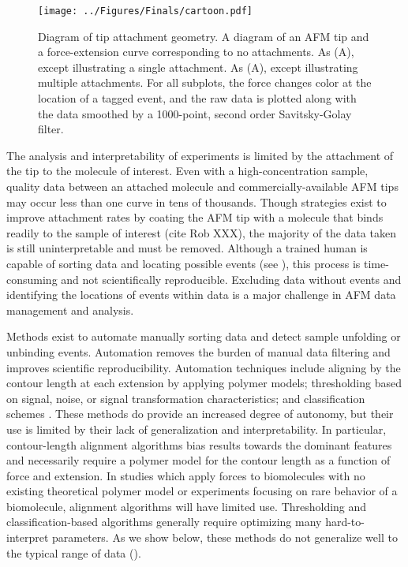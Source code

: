 \begin{figure}[htpb]
\caption[Diagram of AFM attachment geometry]{Diagram of tip attachment geometry.  A diagram of an AFM tip and a force-extension curve corresponding to no attachments.  As (A), except illustrating a single attachment.  As (A), except illustrating multiple attachments. For all subplots, the force changes color at the location of a tagged event, and the raw data is plotted along with the data smoothed by a 1000-point, second order Savitsky-Golay filter. }
\centering
\texttt{[image: ../Figures/Finals/cartoon.pdf]}%
\end{figure}
The analysis and interpretability of \singlemol{} experiments is limited by the attachment of the tip to the molecule of interest. Even with a high-concentration sample, quality \singlemol{} data between an attached molecule and commercially-available AFM tips may occur less than one curve in tens of thousands. Though strategies exist to improve attachment rates by coating the AFM tip with a molecule that binds readily to the sample of interest (cite Rob XXX), the majority of the data taken is still uninterpretable and must be removed. Although a trained human is capable of sorting \singlemol{} data and locating possible events (see ), this process is time-consuming and not scientifically reproducible. Excluding data without events and identifying the locations of events within data is a major challenge in AFM data management and analysis.

Methods exist to automate manually sorting \singlemol{} data and detect sample unfolding or unbinding events. Automation removes the burden of manual data filtering and improves scientific reproducibility. Automation techniques include aligning by the contour length at each extension by applying polymer models; thresholding based on signal, noise, or signal transformation characteristics; and classification schemes . These methods do provide an increased degree of autonomy, but their use is limited by their lack of generalization and interpretability. In particular, contour-length alignment algorithms bias results towards the dominant features and necessarily require a polymer model for the contour length as a function of force and extension. In \singlemol{} studies which apply forces to biomolecules with no existing theoretical polymer model or experiments focusing on rare behavior of a biomolecule, alignment algorithms will have limited use.  Thresholding and classification-based algorithms generally require optimizing many hard-to-interpret parameters. As we show below, these methods do not generalize well to the typical range of \singlemol{} data ().

